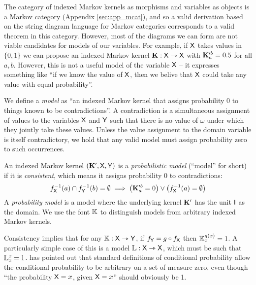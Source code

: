 The category of indexed Markov kernels as morphisms and variables as objects is a Markov category (Appendix \ref{sec:app_mcat}), and so a valid derivation based on the string diagram language for Markov categories corresponds to a valid theorem in this category. However, most of the diagrams we can form are not viable candidates for models of our variables. For example, if $\mathsf{X}$ takes values in $\{0,1\}$ we can propose an indexed Markov kernel $\mathbf{K}:\mathsf{X}\rightarrowtriangle\mathsf{X}$ with $\mathbf{K}_a^{\prime b}=0.5$ for all $a, b$. However, this is not a useful model of the variable $\mathsf{X}$ -- it expresses something like ``if we know the value of $\mathsf{X}$, then we belive that $\mathsf{X}$ could take any value with equal probability''.

We define a \emph{model} as ``an indexed Markov kernel that assigns probability 0 to things known to be contradictions''. A contradiction is a simultaneous assignment of values to the variables $\mathsf{X}$ and $\mathsf{Y}$ such that there is no value of $\omega$ under which they jointly take these values. Unless the value assignment to the domain variable is itself contradictory, we hold that any valid model must assign probability zero to such occurrences.

\begin{definition}
An indexed Markov kernel $(\mathbf{K}',\mathsf{X},\mathsf{Y})$ is a \emph{probabilistic model} (``model'' for short) if it is \emph{consistent}, which means it assigns probability 0 to contradictions:
\begin{align}
	f_{\mathsf{X}}^{-1}(a)\cap f_{\mathsf{Y}}^{-1}(b) = \emptyset \implies \left(\mathbf{K}_{a}^{\prime b} = 0\right) \lor \left(f_{\mathsf{X}}^{-1}(a) = \emptyset\right)
\end{align}
A \emph{probability model} is a model where the underlying kernel $\mathbf{K}'$ has the unit $\mathsf{I}$ as the domain. We use the font $\mathbb{K}$ to distinguish models from arbitrary indexed Markov kernels.
\end{definition}

Consistency implies that for any $\mathbb{K}:\mathsf{X}\rightarrowtriangle\mathsf{Y}$, if $f_{\mathsf{Y}}=g\circ f_{\mathsf{X}}$ then $\mathbb{K}_x^{g(x)}=1$. A particularly simple case of this is a model $\mathbb{L}:\mathsf{X}\rightarrowtriangle\mathsf{X}$, which must be such that $\mathbb{L}_x^x=1$. \citet{hajek_what_2003} has pointed out that standard definitions of conditional probability allow the conditional probability to be arbitrary on a set of measure zero, even though ``the probability $\mathsf{X}=x$, given $\mathsf{X}=x$'' should obviously be 1.


